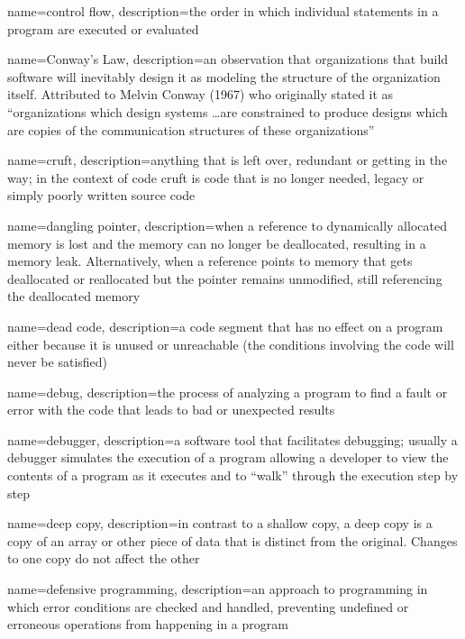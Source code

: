 {
  name=control flow,
  description={the order in which individual statements in a program are executed or evaluated}
}

{
  name=Conway's Law,
  description={an observation that organizations that build software will inevitably design it as modeling the structure of the organization itself.  Attributed to Melvin Conway (1967) who originally stated it as ``organizations which design systems \ldots are constrained to produce designs which are copies of the communication structures of these organizations''}
}

{
  name=cruft,
  description={anything that is left over, redundant or getting in the way; in the context of code cruft is code that is no longer needed, legacy or simply poorly written source code}
}

{
  name=dangling pointer,
  description={when a reference to dynamically allocated memory is lost and the memory can no longer be deallocated, resulting in a memory leak.  Alternatively, when a reference points to memory that gets deallocated or reallocated but the pointer remains unmodified, still referencing the deallocated memory}
}

{
  name=dead code,
  description={a code segment that has no effect on a program either because it is unused or unreachable (the 
	conditions involving the code will never be satisfied)}
}

{
  name=debug,
  description={the process of analyzing a program to find a fault or error with the code that leads to bad or unexpected results}
}

{
  name=debugger,
  description={a software tool that facilitates debugging; usually a debugger simulates the execution of a program allowing a developer to view the contents of a program as it executes and to ``walk'' through the execution step by step}
}

{
  name=deep copy,
  description={in contrast to a shallow copy, a deep copy is a copy of an array or other piece of data that is distinct from the original.  Changes to one copy do not affect the other}
}

{
  name=defensive programming,
  description={an approach to programming in which error conditions are checked and handled, preventing undefined or
  	erroneous operations from happening in a program}
}

